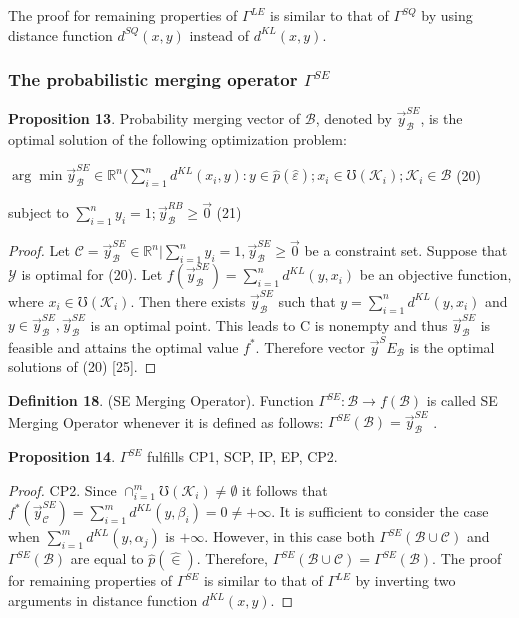 \documentclass[]{iosart2c}
\begin{document}
  The proof for remaining properties of $\Gamma^{LE}$ is similar to that of
  $\Gamma^{SQ}$ by using distance function $d^{SQ}(x, y)$
  instead of $d^{KL}(x, y)$.

  \subsubsection{The probabilistic merging operator $\Gamma^{SE}$}

  \textbf{Proposition 13}. Probability merging vector of $\mathcal{B}$,
  denoted by $\vec{y}^{SE}_\mathcal{B}$, is the optimal solution of the following optimization problem:

  $\arg \min\vec{y}^{SE}_\mathcal{B} \in \mathbb{R}^n (
  \sum^n_{i=1} d^{KL}(x_i, y) :
  y \in \hat{p}(\hat{\varepsilon}); x_i \in \mho(\mathcal{K}_i);\mathcal{K}_i \in \mathcal{B}$ (20)

  subject to $\sum^n_{i=1} y_i = 1; \vec{y}^{RB}_\mathcal{B}\geq\vec{0}$ (21)
  \begin{proof}
    Let $\mathcal{C} = {\vec{y}^{SE}_\mathcal{B} \in \mathbb{R}^n|\sum^n_{i=1} y_i = 1, \vec{y}^{SE}_\mathcal{B}\geq\vec{0}}$
    be a constraint set. Suppose that $\mathcal{Y}$ is optimal for
    (20). Let $f(\vec{y}^{SE}_\mathcal{B})= \sum^n_{i=1} d^{KL}(y, x_i)$ be an objective function,
    where $x_i \in \mho(\mathcal{K}_i)$. Then there exists $\vec{y}^{SE}_\mathcal{B}$
    such that $y = \sum^n_{i=1} d^{KL}(y, x_i)$ and $y \in \vec{y}^{SE}_\mathcal{B} ,\vec{y}^{SE}_\mathcal{B}$ is
    an optimal point. This leads to C is nonempty and
    thus $\vec{y}^{SE}_\mathcal{B}$ is feasible and attains the optimal value $f^*$.
    Therefore vector $\vec{y}^SE_\mathcal{B}$ is the optimal solutions of (20)
    [25].
  \end{proof}


  \textbf{Definition 18}. (SE Merging Operator). Function
  $\Gamma^{SE} : \mathcal{B} \to f(\mathcal{B})$ is called SE Merging Operator
  whenever it is defined as follows:
  $\Gamma^{SE}(\mathcal{B}) = \vec{y}^{SE}_\mathcal{B}$ .

  \textbf{Proposition 14}.
  $\Gamma^{SE}$ fulfills CP1, SCP, IP, EP, CP2.

  \begin{proof}
    CP2. Since $\cap^m_{i=1}\mho(\mathcal{K}_i) \neq \emptyset$ it follows that
    $f^*(\vec{y}^{SE}_\mathcal{C} ) = \sum^m_{i=1} d^{KL}(y, \beta_i) = 0 \neq +\infty$. It is sufficient
    to consider the case when $\sum^m_{i=1} d^{KL}(y, \alpha_j)$
    is $+\infty$. However, in this case both $\Gamma^{SE}(\mathcal{B} \cup \mathcal{C})$ and
    $\Gamma^{SE}(\mathcal{B})$ are equal to $\hat{p}(\hat{\in})$. Therefore, $\Gamma^{SE}(\mathcal{B} \cup \mathcal{C}) =
    \Gamma^{SE}(\mathcal{B})$. The proof for remaining properties of $\Gamma^{SE}$
    is similar to that of $\Gamma^{LE}$ by inverting two arguments
    in distance function $d^{KL}(x, y)$.
  \end{proof}
\end{document}
